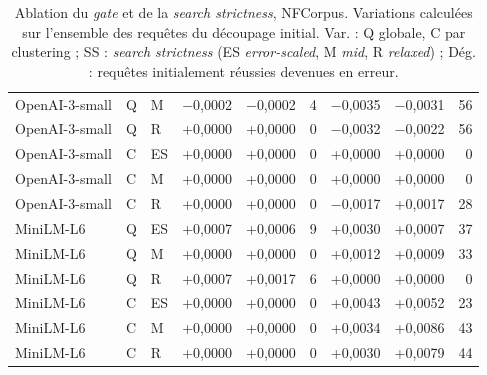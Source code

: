 \documentclass[a4paper,10pt]{article}
\begin{document}
\begin{table}[p]
\begin{tabular}{lllrrrrrr}
OpenAI-3-small & Q & M & $-$0,0002 & $-$0,0002 & 4 & $-$0,0035 & $-$0,0031 & 56 \\
OpenAI-3-small & Q & R & +0,0000 & +0,0000 & 0 & $-$0,0032 & $-$0,0022 & 56 \\
OpenAI-3-small & C & ES & +0,0000 & +0,0000 & 0 & +0,0000 & +0,0000 & 0 \\
OpenAI-3-small & C & M & +0,0000 & +0,0000 & 0 & +0,0000 & +0,0000 & 0 \\
OpenAI-3-small & C & R & +0,0000 & +0,0000 & 0 & $-$0,0017 & +0,0017 & 28 \\
\midrule
MiniLM-L6 & Q & ES & +0,0007 & +0,0006 & 9 & +0,0030 & +0,0007 & 37 \\
MiniLM-L6 & Q & M & +0,0000 & +0,0000 & 0 & +0,0012 & +0,0009 & 33 \\
MiniLM-L6 & Q & R & +0,0007 & +0,0017 & 6 & +0,0000 & +0,0000 & 0 \\
MiniLM-L6 & C & ES & +0,0000 & +0,0000 & 0 & +0,0043 & +0,0052 & 23 \\
MiniLM-L6 & C & M & +0,0000 & +0,0000 & 0 & +0,0034 & +0,0086 & 43 \\
MiniLM-L6 & C & R & +0,0000 & +0,0000 & 0 & +0,0030 & +0,0079 & 44 \\
\bottomrule
\end{tabular}
\caption{Ablation du \textit{gate} et de la \textit{search strictness}, NFCorpus. Variations calculées sur l'ensemble des requêtes du découpage initial. Var. : Q globale, C par clustering ; SS : \textit{search strictness} (ES \textit{error-scaled}, M \textit{mid}, R \textit{relaxed}) ; Dég. : requêtes initialement réussies devenues en erreur.}
\label{tab:s-ablation-nfcorpus}
\end{table}
\end{document}
